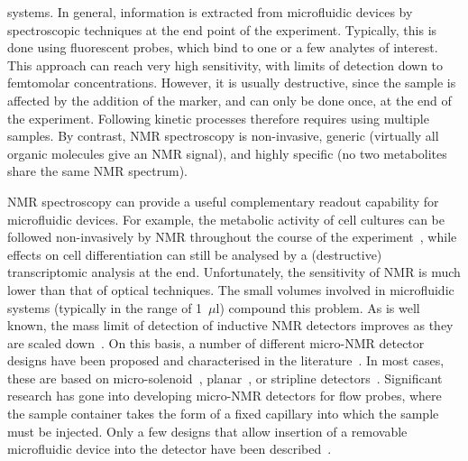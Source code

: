 \documentclass[preprint,5p]{elsarticle}
\begin{document}
systems. In general, information is extracted from microfluidic devices by spectroscopic 
techniques at the end point of the experiment. Typically, 
this is done using fluorescent probes, which bind to one or a few analytes of interest. 
This approach can reach very high sensitivity, with limits of detection down to 
femtomolar concentrations. However, it is usually destructive, since the sample is 
affected by the addition of the marker, and can only be done once, at the end of the 
experiment. Following kinetic processes therefore requires using multiple samples. By 
contrast, NMR spectroscopy is non-invasive, generic (virtually all organic 
molecules give an NMR signal), and highly specific (no two metabolites share 
the same NMR spectrum).

NMR spectroscopy can provide a useful complementary readout capability 
for microfluidic devices. For example, the metabolic activity of cell cultures 
can be followed non-invasively by NMR throughout the course of the experiment~\cite{cellnmr-2015}, 
while effects on cell differentiation can still be analysed by a (destructive) 
transcriptomic analysis at the end. Unfortunately, the sensitivity 
of NMR is much lower than that of optical techniques. 
The small volumes involved in microfluidic systems
 (typically in the range of 1~$\mu$l) 
compound this problem. As is well known, the mass limit of detection of 
inductive NMR detectors improves as they are scaled down~\cite{Olson1995}. 
On this basis, a number of different micro-NMR detector designs have been 
proposed and characterised in the literature~\cite{utz2012review,micronmr2014review}. 
In most cases, these are based on micro-solenoid~\cite{SUBRAMANIAN1998,Pines2007}, 
planar~\cite{Maguire2007,dieter2008,EHRMANN200}, or stripline 
detectors~\cite{stripline_jan}. 
Significant research has gone into developing micro-NMR detectors for flow probes, 
where the sample container takes the form of a fixed capillary into which the sample
must be injected. Only a few designs that allow insertion of a removable microfluidic 
device into the detector have been described~\cite{Spengler-2014,Spengler-2016,gream_2016}.
\end{document}
